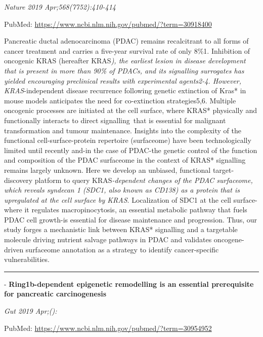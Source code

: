 \documentclass[]{article}
\begin{document}
\emph{Nature 2019 Apr;568(7752):410-414}

PubMed: \url{https://www.ncbi.nlm.nih.gov/pubmed/?term=30918400}

Pancreatic ductal adenocarcinoma (PDAC) remains recalcitrant to all
forms of cancer treatment and carries a five-year survival rate of only
8\%1. Inhibition of oncogenic KRAS (hereafter KRAS\emph{), the earliest
lesion in disease development that is present in more than 90\% of
PDACs, and its signalling surrogates has yielded encouraging preclinical
results with experimental agents2-4. However, KRAS}-independent disease
recurrence following genetic extinction of Kras* in mouse models
anticipates the need for co-extinction strategies5,6. Multiple oncogenic
processes are initiated at the cell surface, where KRAS* physically and
functionally interacts to direct signalling~that is essential for
malignant transformation and tumour maintenance. Insights into the
complexity of the functional cell-surface-protein repertoire
(surfaceome) have been technologically limited until recently and-in the
case of PDAC-the genetic control of the function and composition of the
PDAC surfaceome in the context of KRAS* signalling remains largely
unknown. Here we develop an unbiased, functional target-discovery
platform to query KRAS\emph{-dependent changes of the PDAC surfaceome,
which reveals syndecan 1 (SDC1, also known as CD138) as a protein that
is upregulated at the cell surface by KRAS}. Localization of SDC1 at the
cell surface-where it regulates macropinocytosis, an essential metabolic
pathway that fuels PDAC cell growth-is essential for disease maintenance
and progression. Thus, our study forges a mechanistic link between KRAS*
signalling and a targetable molecule driving nutrient salvage pathways
in PDAC and validates oncogene-driven surfaceome annotation as a
strategy to identify cancer-specific vulnerabilities.

{}

{}

\begin{center}\rule{0.5\linewidth}{\linethickness}\end{center}

 - \textbf{Ring1b-dependent epigenetic remodelling is an essential
prerequisite for pancreatic carcinogenesis}

\emph{Gut 2019 Apr;():}

PubMed: \url{https://www.ncbi.nlm.nih.gov/pubmed/?term=30954952}
\end{document}
